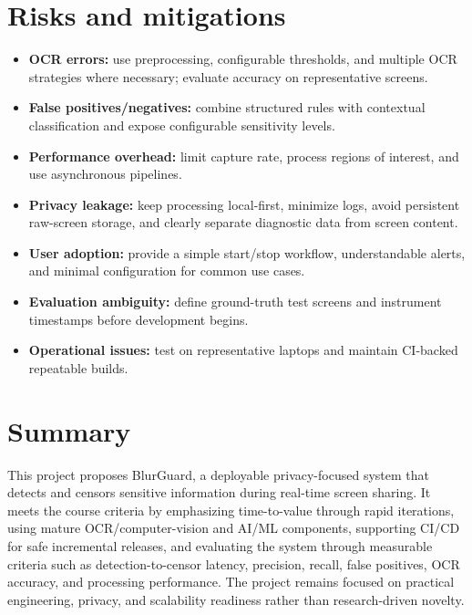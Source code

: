 \documentclass[12pt,a4paper]{article}
\begin{document}
\section{Risks and mitigations}

\begin{itemize}
    \item \textbf{OCR errors:} use preprocessing, configurable thresholds, and multiple OCR strategies where necessary; evaluate accuracy on representative screens.

    \item \textbf{False positives/negatives:} combine structured rules with contextual classification and expose configurable sensitivity levels.

    \item \textbf{Performance overhead:} limit capture rate, process regions of interest, and use asynchronous pipelines.

    \item \textbf{Privacy leakage:} keep processing local-first, minimize logs, avoid persistent raw-screen storage, and clearly separate diagnostic data from screen content.

    \item \textbf{User adoption:} provide a simple start/stop workflow, understandable alerts, and minimal configuration for common use cases.

    \item \textbf{Evaluation ambiguity:} define ground-truth test screens and instrument timestamps before development begins.

    \item \textbf{Operational issues:} test on representative laptops and maintain CI-backed repeatable builds.
\end{itemize}

\newpage


\section{Summary}

This project proposes BlurGuard, a deployable privacy-focused system that detects and censors sensitive information during real-time screen sharing. It meets the course criteria by emphasizing time-to-value through rapid iterations, using mature OCR/computer-vision and AI/ML components, supporting CI/CD for safe incremental releases, and evaluating the system through measurable criteria such as detection-to-censor latency, precision, recall, false positives, OCR accuracy, and processing performance. The project remains focused on practical engineering, privacy, and scalability readiness rather than research-driven novelty.
\end{document}
